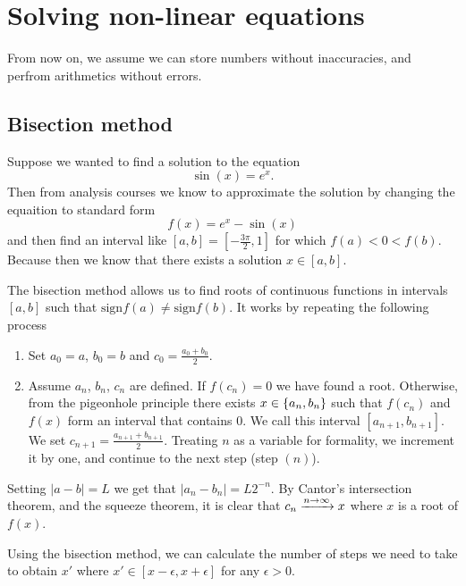 \documentclass[11pt,a4paper]{article}
\begin{document}
\newpage

\section{Solving non-linear equations}
From now on, we assume we can store numbers without inaccuracies, and
perfrom arithmetics without errors.

\subsection{Bisection method}
Suppose we wanted to find a solution to the equation
\[
  \sin(x) = e^x.
\]
Then from analysis courses we know to approximate the solution by changing
the equaition to standard form
\[
  f(x) = e^x - \sin(x)
\]
and then find an interval like $[a, b] = [-\frac{3 \pi}{2}, 1]$ for which
$f(a) < 0 < f(b)$.
Because then we know that there exists a solution $x \in [a,b]$.

The bisection method allows us to find roots of continuous functions in
intervals $[a,b]$ such that $\mathrm{sign} f(a) \neq \mathrm{sign} f(b)$.
It works by repeating the following process
\begin{enumerate}
  \item[(-1)] Set $a_0 = a$, $b_0 = b$ and $c_0 = \frac{a_0 + b_0}{2}$.
  \item[(n)] Assume $a_n$, $b_n$, $c_n$ are defined. If $f(c_n) = 0$
    we have found a root. Otherwise, from the pigeonhole principle there
    exists $x \in \left\{a_n,b_n\right\}$ such that $f(c_n)$ and $f(x)$ form an interval
    that contains $0$. We call this interval $[a_{n + 1}, b_{n + 1}]$.
    We set $c_{n + 1} = \frac{a_{n + 1} + b_{n + 1}}{2}$. Treating $n$
    as a variable for formality, we increment it by one, and continue to
    the next step (step $(n)$).
\end{enumerate}
Setting $|a - b| = L$ we get that $|a_n - b_n| = L 2^{-n}$.
By Cantor's intersection theorem, and the squeeze theorem, it is clear
that $c_n \xrightarrow{n \to \infty} x$ where $x$ is a root of $f(x)$.

\begin{remark}
  Using the bisection method, we can calculate the number of steps we need to
  take to obtain $x'$ where $x' \in [x - \epsilon, x + \epsilon]$ for any
  $\epsilon > 0$.
\end{remark}
\end{document}
